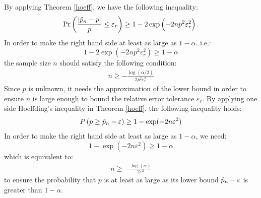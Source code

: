 \documentclass{iitthesis}
\theoremstyle{definition}
\begin{document}

By applying Theorem \ref{hoeff}, we have the following inequality:
\begin{align*}
\Pr\left(\frac{|\hat{p}_n-p|}{p} \leq \varepsilon_r\right) \geq 1-2\exp\left(-2np^2\varepsilon_r^2\right).
\end{align*}
In order to make the right hand side at least as large as $1-\alpha$. i.e.:
$$1-2\exp\left(-2np^2\varepsilon_r^2\right) \geq 1-\alpha$$
the sample size $n$ should satisfy the following condition: 
\begin{align*}
n \geq -\frac{\log (\alpha/2)}{2 p^2 \varepsilon_r^2}
\end{align*}
Since $p$ is unknown, it needs the approximation of the lower bound in order to ensure $n$ is large enough to bound the relative error tolerance $\varepsilon_r$. By applying one side Hoeffding's inequality in Theorem \ref{hoeff}, the following inequality holds:
\begin{align}\label{onesidehoeffn}
P\left(p \geq \hat{p}_n-\varepsilon \right) \geq 1- \exp(-2n\varepsilon^2)
\end{align}
In order to make the right hand side at least as large as $1-\alpha$, we need:
$$1- \exp(-2n\varepsilon^2) \geq 1-\alpha$$
which is equivalent to: 
\begin{align*}
n \geq -\frac{\log(\alpha)} {2\varepsilon^2 }
 \end{align*}
to ensure the probability that $p$  is at least as large as its lower bound $\hat{p}_n-\varepsilon$ is greater than $1-\alpha$.
\end{document}
